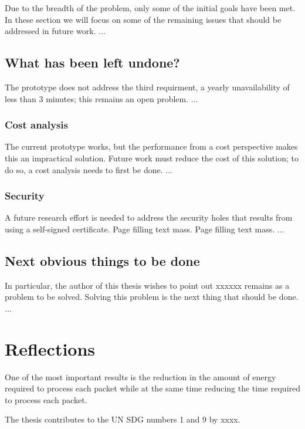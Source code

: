 Due to the breadth of the problem, only some of the initial goals have been
met. In these section we will focus on some of the remaining issues that
should be addressed in future work. ...

\subsection{What has been left undone?}
\label{what-has-been-left-undone}

The prototype does not address the third requirment, \ie a yearly unavailability of less than 3 minutes; this remains an open problem. ...

\subsubsection{Cost analysis}
The current prototype works, but the performance from a cost perspective makes this an impractical solution. Future work must reduce the cost of this solution; to do so, a cost analysis needs to first be done. ...

\subsubsection{Security}
A future research effort is needed to address the security holes that results from using a self-signed certificate. Page filling text mass. Page filling text mass. ...


\subsection{Next obvious things to be done}

In particular, the author of this thesis wishes to point out xxxxxx remains as a problem to be solved. Solving this problem is the next thing that should be done. ...

\section{Reflections}
\label{sec:reflections}



One of the most important results is the reduction in the amount of
energy required to process each packet while at the same time reducing the
time required to process each packet.

The thesis contributes to the UN SDG numbers 1 and 9 by
xxxx. 
